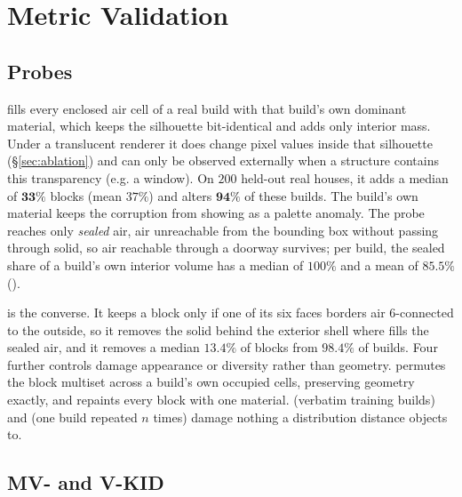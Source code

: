 \section{Metric Validation}
\label{sec:method}

\subsection{Probes}
\label{sec:probes}

\solidify{} fills every enclosed air cell of a real build with that build's own dominant
material, which keeps the silhouette bit-identical and adds only interior mass. Under a
translucent renderer it does change pixel values inside that silhouette
(\S\ref{sec:ablation}) and can only be observed externally when a structure contains this transparency (e.g. a window). On $200$ held-out real houses, it adds a median of $\mathbf{33\%}$
blocks (mean $37\%$) and alters $\mathbf{94\%}$ of these builds. The build's own material keeps
the corruption from showing as a palette anomaly. The probe reaches only \emph{sealed} air, air
unreachable from the bounding box without passing through solid, so air reachable through a
doorway survives; per build, the sealed share of a build's own interior volume has a median
of $100\%$ and a mean of $\mathbf{85.5\%}$ ().

\hollow{} is the converse. It keeps a block only if one of its six faces borders air
$6$-connected to the outside, so it removes the solid behind the exterior shell where
\solidify{} fills the sealed air, and it removes a median $13.4\%$ of blocks from $98.4\%$ of builds. Four further
controls damage appearance or diversity rather than geometry. \matshuffle{} permutes the
block multiset across a build's own occupied cells, preserving geometry exactly, and
\monochrome{} repaints every block with one material. \traincopy{} (verbatim training
builds) and \singlemode{} (one build repeated $n$ times) damage nothing a distribution
distance objects to.

\subsection{MV- and V-KID}


